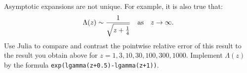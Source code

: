 \documentclass[11pt,letterpaper]{article}
\begin{document}
\begin{enumerate}
Asymptotic expansions are not unique. For example, it is also true that:
\[
\Lambda(z) \sim \dfrac{1}{\sqrt{z+\frac{1}{4}}}\quad{\rm as}\quad z\to\infty.
\]
Use {\sc Julia} to compare and contrast the pointwise relative error of this result to the result you obtain above for $z=1,3,10,30,100,300,1000$. Implement $\Lambda(z)$ by the formula \verb/exp(lgamma(z+0.5)-lgamma(z+1))/.
\end{enumerate}
\end{document}
